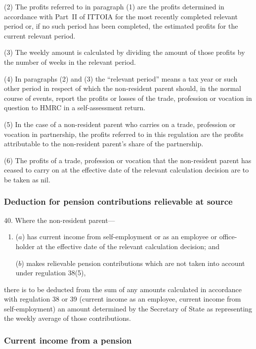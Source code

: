 \documentclass[12pt,a4paper]{article}
\begin{document}
(2) The profits referred to in paragraph (1) are the profits determined in accordance with Part~II of ITTOIA for the most recently completed relevant period or, if no such period has been completed, the estimated profits for the current relevant period.

(3) The weekly amount is calculated by dividing the amount of those profits by the number of weeks in the relevant period.

(4) In paragraphs (2) and (3) the “relevant period” means a tax year or such other period in respect of which the non-resident parent should, in the normal course of events, report the profits or losses of the trade, profession or vocation in question to HMRC in a self-assessment return.

(5) In the case of a non-resident parent who carries on a trade, profession or vocation in partnership, the profits referred to in this regulation are the profits attributable to the non-resident parent’s share of the partnership.

(6) The profits of a trade, profession or vocation that the non-resident parent has ceased to carry on at the effective date of the relevant calculation decision are to be taken as nil.

\subsubsection[40. Deduction for pension contributions relievable at source]{Deduction for pension contributions relievable at source}

40.  Where the non-resident parent—
\begin{enumerate}\item[]
($a$) has current income from self-employment or as an employee or office-holder at the effective date of the relevant calculation decision; and

($b$) makes relievable pension contributions which are not taken into account under regulation 38(5),
\end{enumerate}
there is to be deducted from the sum of any amounts calculated in accordance with regulation 38 or 39 (current income as an employee, current income from self-employment) an amount determined by the Secretary of State as representing the weekly average of those contributions.

\subsubsection[41. Current income from a pension]{Current income from a pension}
\end{document}
